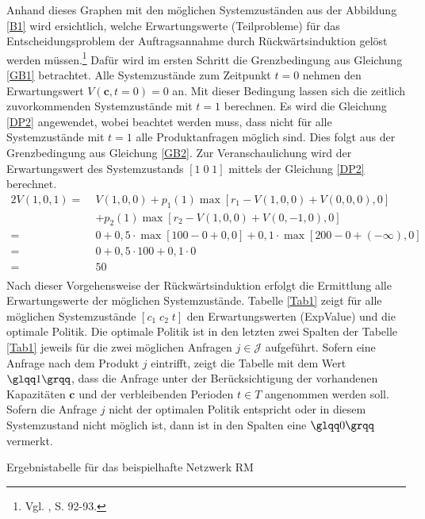 Anhand dieses Graphen mit den möglichen Systemzuständen aus der Abbildung \ref{B1} wird ersichtlich, welche Erwartungswerte (Teilprobleme) für das Entscheidungsproblem der Auftragsannahme durch Rückwärtsinduktion gelöst werden müssen.\footnote{Vgl. \cite{puterman2009markov}, S. 92-93.} Dafür wird im ersten Schritt die Grenzbedingung aus Gleichung \eqref{GB1} betrachtet. Alle Systemzustände zum Zeitpunkt $t=0$ nehmen den Erwartungswert $V(\textbf{c}, t=0)=0$ an. Mit dieser Bedingung lassen sich die zeitlich zuvorkommenden Systemzustände mit $t=1$ berechnen. Es wird die Gleichung \eqref{DP2} angewendet, wobei beachtet werden muss, dass nicht für alle Systemzustände mit $t=1$ alle Produktanfragen möglich sind. Dies folgt aus der Grenzbedingung aus Gleichung \eqref{GB2}. Zur Veranschaulichung wird der Erwartungswert des Systemzustands $[1\;0\;1]$ mittels der Gleichung \eqref{DP2} berechnet.
\begin{alignat*}{2}
V(1,0,1)=\;&V(1,0,0)+p_{1}(1)\max[r_{1}-V(1,0,0)+V(0,0,0),0]\\
&+p_{2}(1)\max[r_{2}-V(1,0,0)+V(0,-1,0),0]\\
=\;&0+0,5\cdot\max[100-0+0,0]+0,1\cdot\max[200-0+(-\infty),0]\\
=\;&0+0,5\cdot 100+0,1\cdot0\\
=\;&50\\
\end{alignat*}
Nach dieser Vorgehensweise der Rückwärtsinduktion erfolgt die Ermittlung alle Erwartungswerte der möglichen Systemzustände. Tabelle \ref{Tab1} zeigt für alle möglichen Systemzustände $[c_1\;c_2\;t]$ den Erwartungswerten (ExpValue) und die optimale Politik. Die optimale Politik ist in den letzten zwei Spalten der Tabelle \ref{Tab1} jeweils für die zwei möglichen Anfragen $j\in\mathcal{J}$ aufgeführt. Sofern eine Anfrage nach dem Produkt $j$ eintrifft, zeigt die Tabelle mit dem Wert $\glqq 1\grqq$, dass die Anfrage unter der Berücksichtigung der vorhandenen Kapazitäten $\textbf{c}$ und der verbleibenden Perioden $t\in T$ angenommen werden soll. Sofern die Anfrage $j$ nicht der optimalen Politik entspricht oder in diesem Systemzustand nicht möglich ist, dann ist in den Spalten eine $\glqq 0\grqq$ vermerkt.
\begin{table}
\begin{footnotesize}
    \caption{Ergebnistabelle für das beispielhafte Netzwerk RM} \label{Tab1}
    \vspace*{3mm}
    \begin{center}
            \end{center}
\end{footnotesize}
\end{table}

